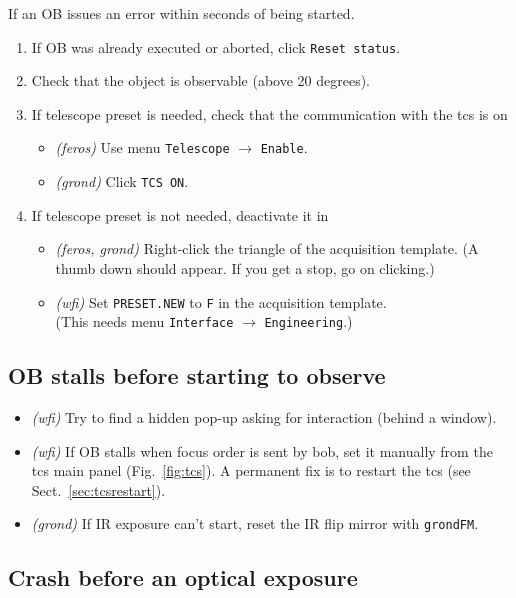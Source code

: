 \documentclass[11pt,fleqn]{book} %
\begin{document}
If an OB issues an error within seconds of being started.
\begin{enumerate}
  \item If OB was already executed or aborted, click \texttt{Reset status}. 
  \item Check that the object is observable (above 20 degrees).
  \item If telescope preset is needed, check that the communication with the \gls{tcs} is on
    \begin{itemize}
       \item \textit{(\gls{feros})} Use menu \texttt{Telescope} $\rightarrow$ \texttt{Enable}.
       \item \textit{(\gls{grond})} Click \texttt{TCS ON}.
    \end{itemize}
  \item If telescope preset is not needed, deactivate it in 
    \begin{itemize}
      \item \textit{(\gls{feros}, \gls{grond})} Right-click the triangle of the acquisition template.
                   (A thumb down should appear.  If you get a stop, go on clicking.)
      \item \textit{(\gls{wfi})} Set \texttt{PRESET.NEW} to \texttt{F} in the acquisition template.\\
         (This needs menu \texttt{Interface} $\rightarrow$ \texttt{Engineering}.) 
    \end{itemize}
\end{enumerate}

\subsection{OB stalls before starting to observe}
\begin{itemize}
\item \textit{(\gls{wfi})} Try to find a hidden pop-up asking for interaction (behind a window).
\item \textit{(\gls{wfi})} If OB stalls when focus order is sent by \gls{bob},
        set it manually from the \gls{tcs} main panel (Fig.~\ref{fig:tcs}).
        A permanent fix is to restart the \gls{tcs} (see Sect.~\ref{sec:tcsrestart}).
\item \textit{(\gls{grond})} If IR exposure can't start, reset the IR flip mirror with \texttt{grondFM}.
\end{itemize}

\subsection{Crash before an optical exposure}
\label{sec:expocrash}
\end{document}
